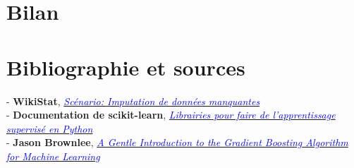 \documentclass[14pt, openany]{article}
\begin{document}
\section{Bilan}

\section{Bibliographie et sources}

\begin{flushleft}
- \textbf{WikiStat}, \href{https://www.math.univ-toulouse.fr/~besse/Wikistat/pdf/st-scenar-app-idm.pdf}{\textit{\textcolor{blue}{Scénario: Imputation de données manquantes}}}\\
\medskip
- \textbf{Documentation de scikit-learn}, \href{http://scikit-learn.org/stable/supervised_learning.html#supervised-learning}{\textit{\textcolor{blue}{Librairies pour faire de l'apprentissage supervisé en Python}}}\\
\medskip
- \textbf{Jason Brownlee}, \href{https://machinelearningmastery.com/gentle-introduction-gradient-boosting-algorithm-machine-learning/}{\textit{\textcolor{blue}{A Gentle Introduction to the Gradient Boosting Algorithm for Machine Learning}}}\\
\end{flushleft}
\end{document}
